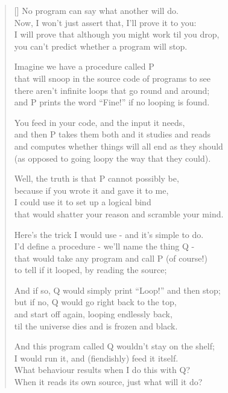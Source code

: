 \settowidth{\versewidth}{And this program called Q wouldn't stay on the shelf;}
\begin{verse}[\versewidth]
  No program can say what another will do.\\
  Now, I won't just assert that, I'll prove it to you:\\
  I will prove that although you might work til you drop,\\
  you can't predict whether a program will stop.

  Imagine we have a procedure called P\\
  that will snoop in the source code of programs to see\\
  there aren't infinite loops that go round and around;\\
  and P prints the word “Fine!” if no looping is found.

  You feed in your code, and the input it needs,\\
  and then P takes them both and it studies and reads\\
  and computes whether things will all end as they should\\
  (as opposed to going loopy the way that they could).

  Well, the truth is that P cannot possibly be,\\
  because if you wrote it and gave it to me,\\
  I could use it to set up a logical bind\\
  that would shatter your reason and scramble your mind.

  Here's the trick I would use - and it's simple to do.\\
  I'd define a procedure - we'll name the thing Q -\\
  that would take any program and call P (of course!)\\
  to tell if it looped, by reading the source;

  And if so, Q would simply print “Loop!” and then stop;\\
  but if no, Q would go right back to the top, \\
  and start off again, looping endlessly back,\\
  til the universe dies and is frozen and black.

  And this program called Q wouldn't stay on the shelf;\\
  I would run it, and (fiendishly) feed it itself.\\
  What behaviour results when I do this with Q?\\
  When it reads its own source, just what will it do?


\end{verse}
